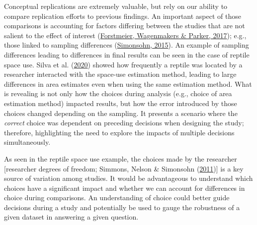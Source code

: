 \documentclass[10pt,a4paper]{article}
\begin{document}
Conceptual replications are extremely valuable, but rely on our ability to compare replication efforts to previous findings.
An important aspect of those comparisons is accounting for factors differing between the studies that are not salient to the effect of interest (\protect\hyperlink{ref-forstmeier_detecting_2017}{Forstmeier, Wagenmakers \& Parker, 2017}); e.g., those linked to sampling differences (\protect\hyperlink{ref-simonsohn_small_2015}{Simonsohn, 2015}).
An example of sampling differences leading to differences in final results can be seen in the case of reptile space use.
Silva et al. (\protect\hyperlink{ref-silva_reptiles_2020}{2020}) showed how frequently a reptile was located by a researcher interacted with the space-use estimation method, leading to large differences in area estimates even when using the same estimation method.
What is revealing is not only how the choices during analysis (e.g., choice of area estimation method) impacted results, but how the error introduced by those choices changed depending on the sampling.
It presents a scenario where the \emph{correct} choice was dependent on preceding decisions when designing the study; therefore, highlighting the need to explore the impacts of multiple decisions simultaneously.

As seen in the reptile space use example, the choices made by the researcher {[}researcher degrees of freedom; Simmons, Nelson \& Simonsohn (\protect\hyperlink{ref-simmons_false-positive_2011}{2011}){]} is a key source of variation among studies.
It would be advantageous to understand which choices have a significant impact and whether we can account for differences in choice during comparisons.
An understanding of choice could better guide decisions during a study and potentially be used to gauge the robustness of a given dataset in answering a given question.
\end{document}
